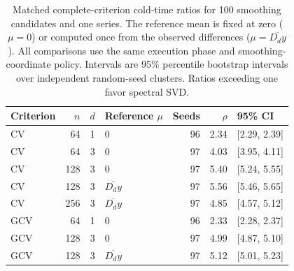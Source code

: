 \begin{table}[t]
\caption{Matched complete-criterion cold-time ratios for 100 smoothing candidates and one series. The reference mean is fixed at zero ($\mu=0$) or computed once from the observed differences ($\mu=\overline{D_dy}$). All comparisons use the same execution phase and smoothing-coordinate policy. Intervals are 95\% percentile bootstrap intervals over independent random-seed clusters. Ratios exceeding one favor spectral SVD.}
\label{tab:empirical-paired}
\centering\small
\begin{tabular}{lrrlrrl}
\toprule
Criterion & $n$ & $d$ & Reference $\mu$ & Seeds & $\rho$ & 95\% CI\\
\midrule
CV & 64 & 1 & $0$ & 96 & 2.34 & [2.29, 2.39]\\
CV & 64 & 3 & $0$ & 97 & 4.03 & [3.95, 4.11]\\
CV & 128 & 3 & $0$ & 97 & 5.40 & [5.24, 5.55]\\
CV & 128 & 3 & $\overline{D_dy}$ & 97 & 5.56 & [5.46, 5.65]\\
CV & 256 & 3 & $\overline{D_dy}$ & 97 & 4.85 & [4.57, 5.12]\\
GCV & 64 & 1 & $0$ & 96 & 2.33 & [2.28, 2.37]\\
GCV & 128 & 3 & $0$ & 97 & 4.99 & [4.87, 5.10]\\
GCV & 128 & 3 & $\overline{D_dy}$ & 97 & 5.12 & [5.01, 5.23]\\
\bottomrule
\end{tabular}
\end{table}
